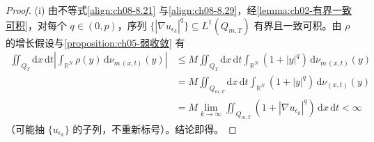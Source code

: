 \documentclass[../../main.tex]{subfiles}%
\begin{document}
\begin{proof}
(i) 由不等式\eqref{align:ch08-8.21} 与\eqref{align:ch08-8.29}，经\cref{lemma:ch02-有界一致可积}，对每个 $q\in(0,p)$，序列 $\{|\nabla u_{\epsilon_k}|^q\}\subseteq L^1(Q_{m,T})$ 有界且一致可积。由 $\rho$ 的增长假设与\cref{proposition:ch05-弱收敛} 有
\begin{align*}
\iint_{Q_T}\mathrm{d}x\,\mathrm{d}t\left|\int_{\mathbb{R}^N}\rho(y)\,\mathrm{d}\nu_{m\,(x,t)}(y)\right|
&\leqslant M\iint_{Q_T}\mathrm{d}x\,\mathrm{d}t\int_{\mathbb{R}^N}(1+|y|^q)\,\mathrm{d}\nu_{m\,(x,t)}(y)\\
&=M\iint_{Q_{m,T}}\mathrm{d}x\,\mathrm{d}t\int_{\mathbb{R}^N}(1+|y|^q)\,\mathrm{d}\nu_{(x,t)}(y)\\
&=M\lim_{k\to\infty}\iint_{Q_{m,T}}(1+|\nabla u_{\epsilon_k}|^q)\,\mathrm{d}x\,\mathrm{d}t<\infty
\end{align*}
（可能抽 $\{u_{\epsilon_k}\}$ 的子列，不重新标号）。结论即得。


\end{proof}
\end{document}
